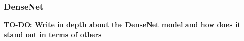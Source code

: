 \subsubsection{DenseNet}
\textbf{TO-DO: Write in depth about the DenseNet model and how does it stand out in terms of others}